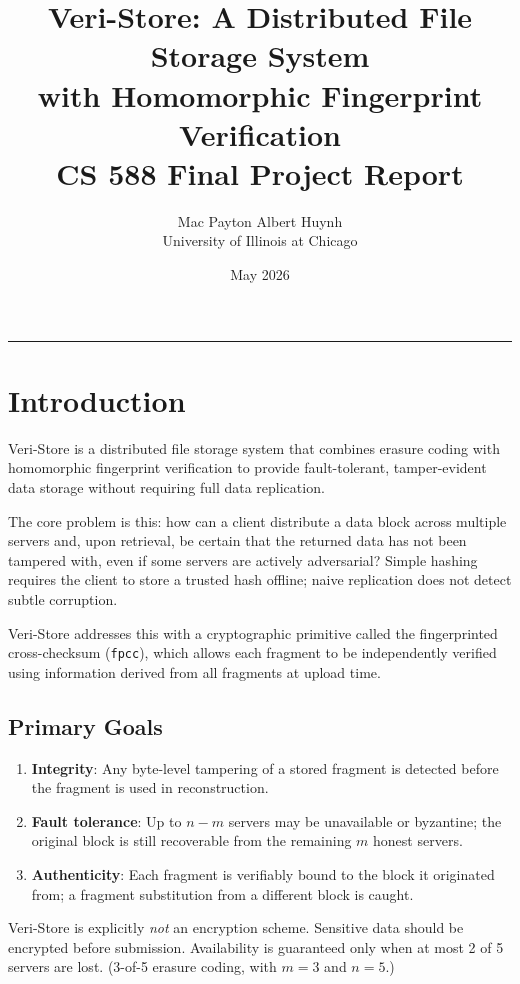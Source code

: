 \documentclass[10pt]{article}
\title{\textbf{Veri-Store: A Distributed File Storage System\\
               with Homomorphic Fingerprint Verification}\\[0.4em]
       \large CS 588 Final Project Report}
\author{Mac Payton \quad Albert Huynh\\
        University of Illinois at Chicago}
\date{May 2026}
\begin{document}
\maketitle
\vspace{-1em}
\hrule
\vspace{0.6em}

\section{Introduction}

Veri-Store is a distributed file storage system that combines erasure coding with homomorphic fingerprint verification to provide fault-tolerant, tamper-evident data storage without requiring full data replication.

The core problem is this: how can a client distribute a data block across multiple servers and, upon retrieval, be certain that the returned data has not been tampered with, even if some servers are actively adversarial? Simple hashing requires the client to store a trusted hash offline; naive replication does not detect subtle corruption.

Veri-Store addresses this with a cryptographic primitive called the fingerprinted cross-checksum (\texttt{fpcc}), which allows each fragment to be independently verified using information derived from all fragments at upload time.

\subsection*{Primary Goals}
\begin{enumerate}
  \item \textbf{Integrity}: Any byte-level tampering of a stored fragment is detected before the fragment is used in reconstruction.
  \item \textbf{Fault tolerance}: Up to $n - m$ servers may be unavailable or byzantine; the original block is still recoverable from the remaining $m$ honest servers.
  \item \textbf{Authenticity}: Each fragment is verifiably bound to the block it originated from; a fragment substitution from a different block is caught.
\end{enumerate}

Veri-Store is explicitly \emph{not} an encryption scheme. Sensitive data should be encrypted before submission. Availability is guaranteed only when at most 2 of 5 servers are lost. (3-of-5 erasure coding, with $m = 3$ and $n = 5$.)
\end{document}
